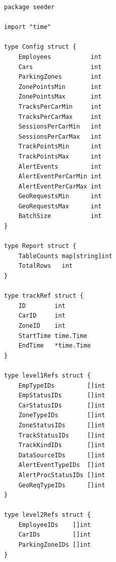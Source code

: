 \begin{lstlisting}[style=gostyle, caption={Типы данных сидера (internal/seeder/types.go)}, label={lst:goTypes}]
package seeder

import "time"

type Config struct {
	Employees           int
	Cars                int
	ParkingZones        int
	ZonePointsMin       int
	ZonePointsMax       int
	TracksPerCarMin     int
	TracksPerCarMax     int
	SessionsPerCarMin   int
	SessionsPerCarMax   int
	TrackPointsMin      int
	TrackPointsMax      int
	AlertEvents         int
	AlertEventPerCarMin int
	AlertEventPerCarMax int
	GeoRequestsMin      int
	GeoRequestsMax      int
	BatchSize           int
}

type Report struct {
	TableCounts map[string]int
	TotalRows   int
}

type trackRef struct {
	ID        int
	CarID     int
	ZoneID    int
	StartTime time.Time
	EndTime   *time.Time
}

type level1Refs struct {
	EmpTypeIDs         []int
	EmpStatusIDs       []int
	CarStatusIDs       []int
	ZoneTypeIDs        []int
	ZoneStatusIDs      []int
	TrackStatusIDs     []int
	TrackKindIDs       []int
	DataSourceIDs      []int
	AlertEventTypeIDs  []int
	AlertProcStatusIDs []int
	GeoReqTypeIDs      []int
}

type level2Refs struct {
	EmployeeIDs    []int
	CarIDs         []int
	ParkingZoneIDs []int
}
\end{lstlisting}
\newpage

